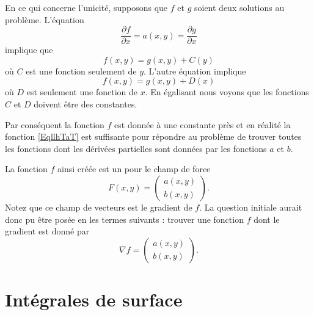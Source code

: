 En ce qui concerne l'unicité, supposons que \( f\) et \( g\) soient deux solutions au problème. L'équation
\begin{equation}
    \frac{ \partial f }{ \partial x }=a(x,y)=\frac{ \partial g }{ \partial x }
\end{equation}
implique que 
\begin{equation}
    f(x,y)=g(x,y)+C(y)
\end{equation}
où \( C\) est une fonction seulement de \( y\). L'autre équation implique
\begin{equation}
    f(x,y)=g(x,y)+D(x)
\end{equation}
où \( D\) est seulement une fonction de \( x\). En égalisant nous voyons que les fonctions \( C\) et \( D\) doivent être des constantes.

Par conséquent la fonction \( f\) est donnée à une constante près et en réalité la fonction \eqref{EqllhTaT} est suffisante pour répondre au problème de trouver toutes les fonctions dont les dérivées partielles sont données par les fonctions \( a\) et \( b\).

La fonction \( f\) ainsi créée est un  pour le champ de force
\begin{equation}
    F(x,y)=\begin{pmatrix}
        a(x,y)    \\ 
        b(x,y)  
    \end{pmatrix}.
\end{equation}
Notez que ce champ de vecteurs est le gradient de \( f\). La question initiale aurait donc pu être posée en les termes suivants : trouver une fonction \( f\) dont le gradient est donné par
\begin{equation}
    \nabla f=\begin{pmatrix}
        a(x,y)    \\ 
        b(x,y)    
    \end{pmatrix}.
\end{equation}


\section{Intégrales de surface}

